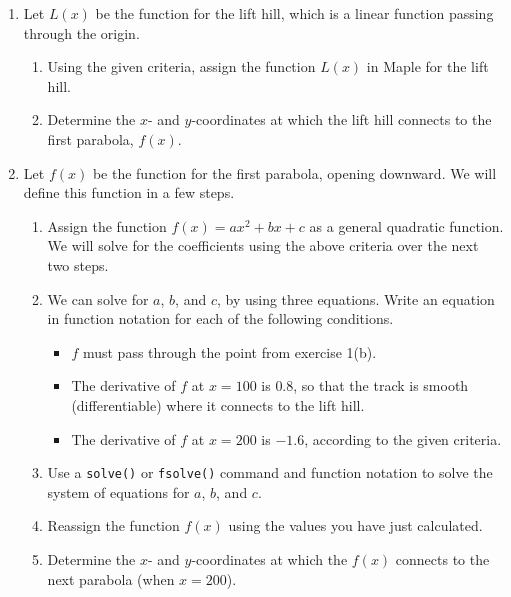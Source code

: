 \begin{enumerate}
	\item Let $L(x)$ be the function for the lift hill, which is a linear function passing through the origin. 
	\begin{enumerate}
		\item Using the given criteria, assign the function $L(x)$ in Maple for the lift hill.
		\item Determine the $x$- and $y$-coordinates at which the lift hill connects to the first parabola, $f(x)$.
	\end{enumerate}
	
	\item Let $f(x)$ be the function for the first parabola, opening downward. We will define this function in a few steps.
	\begin{enumerate}
		\item Assign the function $f(x)=ax^2+bx+c$ as a general quadratic function. We will solve for the coefficients using the above criteria over the next two steps.
		\item We can solve for $a$, $b$, and $c$, by using three equations. Write an equation in function notation for each of the following conditions.
			\begin{itemize}
			\item $f$ must pass through the point from exercise 1(b).
			\item The derivative of $f$ at $x=100$ is $0.8$, so that the track is smooth (differentiable) where it connects to the lift hill.
			\item The derivative of $f$ at $x=200$ is $-1.6$, according to the given criteria.
			\end{itemize}
	\item Use a \texttt{solve()}	 or \texttt{fsolve()}	 command and function notation to solve the system of equations for $a$, $b$, and $c$.
		\item Reassign the function $f(x)$ using the values you have just calculated.
		\item Determine the $x$- and $y$-coordinates at which the $f(x)$ connects to the next parabola (when $x=200$).
	\end{enumerate}
	

\end{enumerate}
